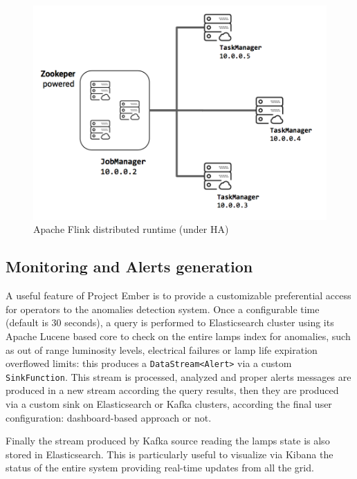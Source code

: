 \begin{figure}[!b]
\begin{center}
	\includegraphics[scale=0.40]{img/ember_ha}
	\caption{Apache Flink distributed runtime (under HA)}
	\label{fig:ember_ha}
\end{center}
\end{figure}

\subsection*{Monitoring and Alerts generation}
A useful feature of Project Ember is to provide a customizable preferential access for operators to the anomalies detection system. Once a configurable time (default is 30 seconds), a query is performed to Elasticsearch cluster using its Apache Lucene based core to check on the entire lamps index for anomalies, such as out of range luminosity levels, electrical failures or lamp life expiration overflowed limits: this produces a \texttt{DataStream<Alert>} via a custom \texttt{SinkFunction}. This stream is processed, analyzed and proper alerts messages are produced in a new stream according the query results, then they are produced via a custom sink on Elasticsearch or Kafka clusters, according the final user configuration: dashboard-based approach or not.

Finally the stream produced by Kafka source reading the lamps state is also stored in Elasticsearch. This is particularly useful to visualize via Kibana the status of the entire system providing real-time updates from all the grid. 

